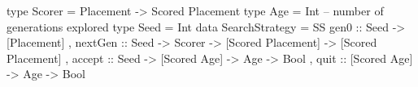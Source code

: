 type Scorer = Placement -> Scored Placement
type Age  = Int -- number of generations explored
type Seed = Int
data SearchStrategy = 
 SS { gen0    :: Seed -> [Placement]
    , nextGen :: Seed -> Scorer 
              -> [Scored Placement] -> [Scored Placement]
    , accept  :: Seed -> [Scored Age] -> Age -> Bool
    , quit    ::         [Scored Age] -> Age -> Bool
    }
